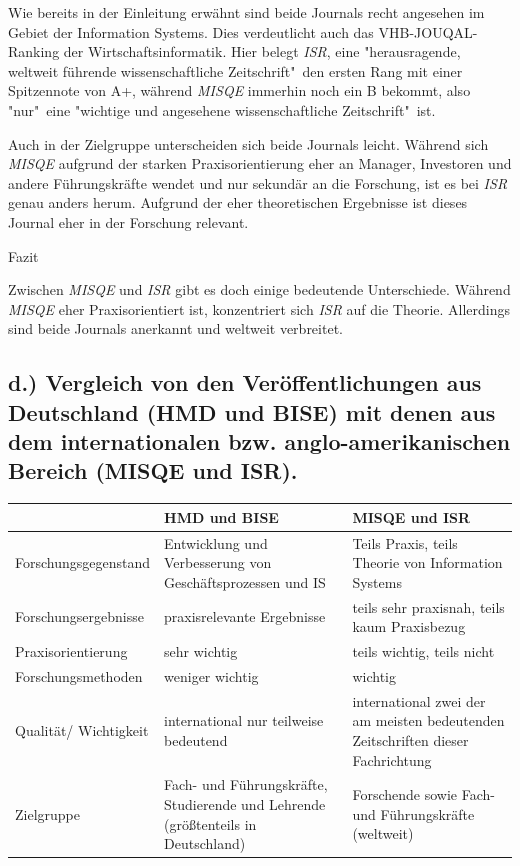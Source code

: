 \documentclass[12pt,utf8]{scrartcl}
\begin{document}
\begin{flushleft}
Wie bereits in der Einleitung erwähnt sind beide Journals recht angesehen im Gebiet der Information Systems. Dies verdeutlicht auch das VHB-JOUQAL-Ranking der Wirtschaftsinformatik. Hier belegt \emph{ISR}, eine "herausragende, weltweit führende wissenschaftliche Zeitschrift"\ den ersten Rang mit einer Spitzennote von A+, während \emph{MISQE} immerhin noch ein B bekommt, also "nur"\ eine "wichtige und angesehene wissenschaftliche Zeitschrift"\ ist\cite{VHBJ}.

Auch in der Zielgruppe unterscheiden sich beide Journals leicht. Während sich \emph{MISQE} aufgrund der starken Praxisorientierung eher an Manager, Investoren und andere Führungskräfte\citep{Chasin2017}\citep{MISQE} wendet und nur sekundär an die Forschung, ist es bei \emph{ISR} genau anders herum. Aufgrund der eher theoretischen Ergebnisse ist dieses Journal eher in der Forschung relevant\citep{ISR}. 
\newline

{\Large Fazit}

Zwischen \emph{MISQE} und \emph{ISR} gibt es doch einige bedeutende Unterschiede. Während \emph{MISQE} eher Praxisorientiert ist, konzentriert sich \emph{ISR} auf die Theorie. Allerdings sind beide Journals anerkannt und weltweit verbreitet. 



\subsection{\label{sub4:einfuehrung}d.) Vergleich von den Veröffentlichungen aus Deutschland (HMD und BISE) mit denen aus dem internationalen bzw. anglo-amerikanischen Bereich (MISQE und ISR).}

\begin{tabular}{|p{4cm}|p{5.5cm}|p{5.5cm}|}
\hline
& HMD und BISE & MISQE und ISR \\
\hline
Forschungsgegenstand & Entwicklung und Verbesserung von Geschäftsprozessen und IS & Teils Praxis, teils Theorie von Information Systems \\
\hline
Forschungsergebnisse & praxisrelevante Ergebnisse & teils sehr praxisnah, teils kaum Praxisbezug \\
\hline
Praxisorientierung & sehr wichtig & teils wichtig, teils nicht \\
\hline
Forschungsmethoden & weniger wichtig & wichtig \\
\hline
Qualität/ Wichtigkeit & international nur teilweise bedeutend & international zwei der am meisten bedeutenden Zeitschriften dieser Fachrichtung \\
\hline
Zielgruppe & Fach- und Führungskräfte, Studierende und Lehrende (größtenteils in Deutschland) & Forschende sowie Fach- und Führungskräfte (weltweit) \\
\hline
\end{tabular}
\newline
\newline
\newline


\end{flushleft}
\end{document}
